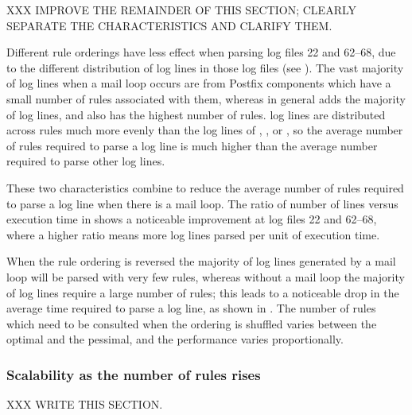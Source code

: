 
XXX IMPROVE THE REMAINDER OF THIS SECTION\@; CLEARLY SEPARATE THE
CHARACTERISTICS AND CLARIFY THEM\@.

Different rule orderings have less effect when parsing log files 22 and
62--68, due to the different distribution of log lines in those log files
(see ).  The vast
majority of log lines when a mail loop occurs are from Postfix components
which have a small number of rules associated with them, whereas in general
 adds the majority of log lines, and also has the highest
number of rules.   log lines are distributed across rules
much more evenly than the log lines of , ,
 or , so the average number of rules
required to parse a  log line is much higher than the average
number required to parse other log lines.

These two characteristics combine to reduce the average number of rules
required to parse a log line when there is a mail loop.  The ratio of
number of lines versus execution time in  shows a noticeable improvement at log files 22
and 62--68, where a higher ratio means more log lines parsed per unit of
execution time.

When the rule ordering is reversed the majority of log lines generated by a
mail loop will be parsed with very few rules, whereas without a mail loop
the majority of log lines require a large number of rules; this leads to a
noticeable drop in the average time required to parse a log line, as shown
in .  The
number of rules which need to be consulted when the ordering is shuffled
varies between the optimal and the pessimal, and the performance varies
proportionally.

\subsubsection{Scalability as the number of rules rises}

\label{scalability as the number of rules rises}

XXX WRITE THIS SECTION\@.


